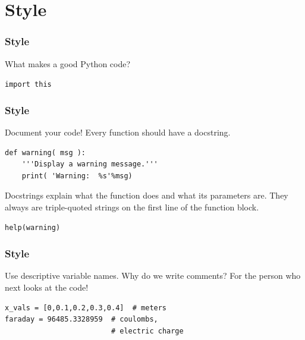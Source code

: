 \documentclass[11pt]{beamer}
\begin{document}

\section{Style}

\begin{frame}[fragile]
  \frametitle{Style}
  \Enlarge

  \begin{enumerate}
  \myitem  What makes a good Python code? %
  \end{enumerate}
  \begin{center}
    \textcolor{CS101Base}{\Huge \texttt{import this}}
  \end{center}
\end{frame}

\begin{frame}[fragile]
  \frametitle{Style}
  \Enlarge

  \begin{enumerate}
  \myitem  Document your code!
  \myitem  Every function should have a docstring.
  \end{enumerate}
  \begin{Verbatim}
def warning( msg ):
    '''Display a warning message.'''
    print( 'Warning:  %s'%msg)
  \end{Verbatim}
  \begin{enumerate}
  \myitem  Docstrings explain what the function does and what its parameters are.
  \myitem  They always are triple-quoted strings on the first line of the function block.
  \end{enumerate}
  \begin{Verbatim}
help(warning)
  \end{Verbatim}
\end{frame}

\begin{frame}[fragile]
  \frametitle{Style}
  \Enlarge

  \begin{enumerate}
  \myitem  Use descriptive variable names. %
  \myitem  Why do we write comments? %
  \myitem  For the person who next looks at the code!
  \begin{Verbatim}
x_vals = [0,0.1,0.2,0.3,0.4]  # meters
faraday = 96485.3328959  # coulombs,
                         # electric charge
  \end{Verbatim}
  \end{enumerate}
\end{frame}
\end{document}
